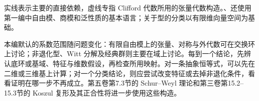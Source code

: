实线表示主要的直接依赖，虚线专指 Clifford 代数所用的张量代数构造。、还使用第一编中自由模、商模和泛性质的基本语言；关于型的分类以有限维向量空间为基础。

\ProseParagraphBreak
本编默认的系数范围随问题变化：有限自由模上的张量、对称与外代数可在交换环上讨论；非退化型、Witt 分解及经典群则主要在域上讨论。每到一个结论，先辨认底环或基域、特征与维数假设，再检查所用映射。对一条抽象恒等式，可以先在二维或三维基上计算；对一个分类结论，则应尝试改变特征或去掉非退化条件，看看证明在哪一步不再成立。第五卷第7.3节的 Schur--Weyl 理论和第三卷第15.2--15.3节的 Koszul 复形及其正合性将进一步使用这些构造。




